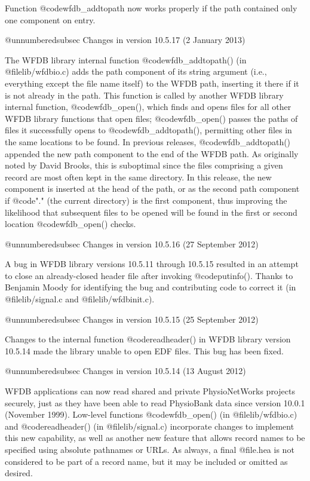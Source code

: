 {{{{{{{{Function @code{wfdb_addtopath} now works properly if the path contained
only one component on entry.

@unnumberedsubsec Changes in version 10.5.17 (2 January 2013)

The WFDB library internal function @code{wfdb_addtopath()} (in
@file{lib/wfdbio.c}) adds the path component of its string argument (i.e.,
everything except the file name itself) to the WFDB path, inserting it there if
it is not already in the path.  This function is called by another WFDB library
internal function, @code{wfdb_open()}, which finds and opens files for all
other WFDB library functions that open files; @code{wfdb_open()} passes the
paths of files it successfully opens to @code{wfdb_addtopath()}, permitting
other files in the same locations to be found.  In previous releases,
@code{wfdb_addtopath()} appended the new path component to the end of the WFDB
path.  As originally noted by David Brooks, this is suboptimal since the files
comprising a given record are most often kept in the same directory.  In this
release, the new component is inserted at the head of the path, or as the
second path component if @code{"."} (the current directory) is the first
component, thus improving the likelihood that subsequent files to be opened
will be found in the first or second location @code{wfdb_open()} checks.

@unnumberedsubsec Changes in version 10.5.16 (27 September 2012)

A bug in WFDB library versions 10.5.11 through 10.5.15 resulted in an attempt
to close an already-closed header file after invoking @code{putinfo()}.  Thanks
to Benjamin Moody for identifying the bug and contributing code to correct it
(in @file{lib/signal.c} and @file{lib/wfdbinit.c}).

@unnumberedsubsec Changes in version 10.5.15 (25 September 2012)

Changes to the internal function @code{readheader()} in WFDB library version
10.5.14 made the library unable to open EDF files.  This bug has been
fixed.

@unnumberedsubsec Changes in version 10.5.14 (13 August 2012)

WFDB applications can now read shared and private PhysioNetWorks projects
securely, just as they have been able to read PhysioBank data since version
10.0.1 (November 1999).  Low-level functions @code{wfdb_open()} (in
@file{lib/wfdbio.c}) and @code{readheader()} (in @file{lib/signal.c})
incorporate changes to implement this new capability, as well as another new
feature that allows record names to be specified using absolute pathnames or
URLs.  As always, a final @file{.hea} is not considered to be part of a record
name, but it may be included or omitted as desired.

}}}}}}}}
